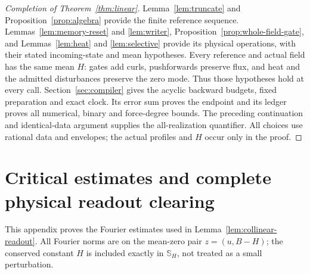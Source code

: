 \documentclass[11pt,a4paper]{amsart}
\theoremstyle{definition}
\theoremstyle{remark}
\numberwithin{equation}{section}
\begin{document}
\begin{proof}[Completion of Theorem~\ref{thm:linear}]
Lemma~\ref{lem:truncate} and Proposition~\ref{prop:algebra} provide the finite
reference sequence. Lemmas~\ref{lem:memory-reset} and \ref{lem:writer},
Proposition~\ref{prop:whole-field-gate}, and Lemmas~\ref{lem:heat} and
\ref{lem:selective} provide its physical operations, with their stated
incoming-state and mean hypotheses. Every reference and actual field has
the same mean $H$: gates add curls, pushforwards preserve flux, and heat
and the admitted disturbances preserve the zero mode. Thus those hypotheses
hold at every call. Section~\ref{sec:compiler} gives the acyclic backward
budgets, fixed preparation and exact clock. Its error sum proves the endpoint
and its ledger proves all numerical, binary and force-degree bounds.
The preceding continuation and identical-data argument supplies the
all-realization quantifier. All choices use rational data and envelopes;
the actual profiles and $H$ occur only in the proof.
\end{proof}


\section{Critical estimates and complete physical readout clearing}
\label{app:readout-estimates}
This appendix proves the Fourier estimates used in
Lemma~\ref{lem:collinear-readout}.  All Fourier norms are on the mean-zero
pair $z=(u,B-H)$; the conserved constant $H$ is included exactly in
$\mathbb S_H$, not treated as a small perturbation.
\end{document}
